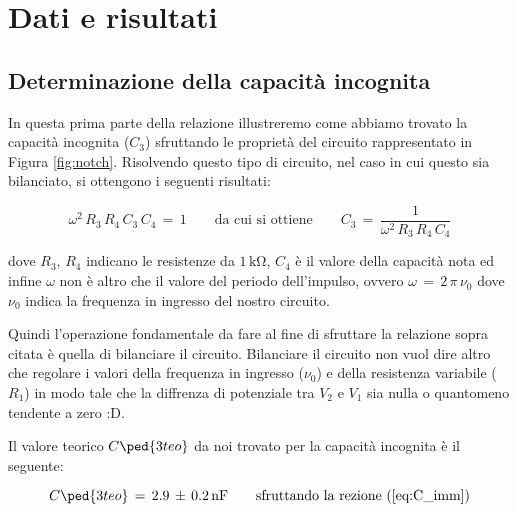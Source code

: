 \section*{Dati e risultati}

\subsection*{Determinazione della capacità incognita}

In questa prima parte della relazione illustreremo come abbiamo trovato la capacità incognita ($C_3$) sfruttando le proprietà del circuito rappresentato in Figura \ref{fig:notch}.
Risolvendo questo tipo di circuito, nel caso in cui questo sia bilanciato, si ottengono i seguenti risultati:

\begin{equation}
	\omega^2\,R_3\,R_4\,C_3\,C_4 \,=\, 1 \qquad \text{da cui si ottiene} \qquad C_3 \,=\, \frac{1}{\omega^2\,R_3\,R_4\,C_4}
	\label{eq:C_imm}
\end{equation}

dove $R_3,\,R_4$ indicano le resistenze da $1\,\si{\kilo\ohm}$, $C_4$ è il valore della capacità nota ed infine $\omega$ non è altro che il valore del periodo dell'impulso, ovvero $\omega \,=\, 2\,\pi\,\nu_0$ dove $\nu_0$ indica la frequenza in ingresso del nostro circuito.

Quindi l'operazione fondamentale da fare al fine di sfruttare la relazione sopra citata è quella di bilanciare il circuito. Bilanciare il circuito non vuol dire altro che regolare i valori della frequenza in ingresso ($\nu_0$) e della resistenza variabile ($R_1$) in modo tale che la diffrenza di potenziale tra $V_2$ e $V_1$ sia nulla o quantomeno tendente a zero :D.

Il valore teorico $C\ped{3teo}$ da noi trovato per la capacità incognita è il seguente:

\begin{equation}
	C\ped{3teo} \,=\, 2.9 \,\pm\, 0.2 \,\si{\nano\farad}  \qquad \text{sfruttando la rezione (\ref{eq:C_imm})}
	\label{eq:C_teo_imm}
\end{equation}

